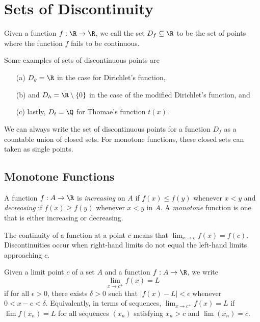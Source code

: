 \section{Sets of Discontinuity} 

\begin{tcolorbox}
\begin{defn}
Given a function \( f: \R \to \R  \), we call the set \( D_f \subseteq \R  \) to be the set of points where the function \( f  \) fails to be continuous.
\end{defn}
\end{tcolorbox}

Some examples of sets of discontinuous points are
\begin{enumerate}
    \item[(a)] \( D_g = \R  \) in the case for Dirichlet's function, 
    \item[(b)] and \( D_{h} = \R \setminus \{ 0 \}  \) in the case of the modified Dirichlet's function, and 
    \item[(c)] lastly, \( D_{t} = \Q  \) for Thomae's function \( t(x)  \).
\end{enumerate}

We can always write the set of discontinuous points for a function \( D_f  \) as a countable union of closed sets. For monotone functions, these closed sets can taken as single points.

\subsection{Monotone Functions}

\begin{tcolorbox}
\begin{defn}
A function \( f: A \to \R  \) is \textit{increasing} on \( A \) if \( f(x) \leq f(y)  \) whenever \( x < y  \) and \textit{decreasing} if \( f(x) \geq f(y)  \) whenever \( x < y  \) in \( A  \). A \textit{monotone} function is one that is either increasing or decreasing.
\end{defn}
\end{tcolorbox}

The continuity of a function at a point \( c  \) means that \( \lim_{ x \to c } f(x) = f(c) \). Discontinuities occur when right-hand limits do not equal the left-hand limits approaching \( c  \). 

\begin{tcolorbox}
\begin{defn}
Given a limit point \( c  \) of a set \( A  \) and a function \( f: A \to \R  \), we write
\[ \lim_{ x \to c^{+}   }  f(x) = L \]
if for all \( \epsilon > 0  \), there exists \( \delta > 0  \) such that \( | f(x) -  L  | < \epsilon  \) whenever \( 0 < x - c < \delta  \). Equivalently, in terms of sequences, \( \lim_{ x  \to c^{+} } f(x) = L  \) if \( \lim f(x_n) = L  \) for all sequences \( (x_n)  \) satisfying \( x_n >  c  \) and \( \lim (x_n) = c  \).
\end{defn}
\end{tcolorbox}

